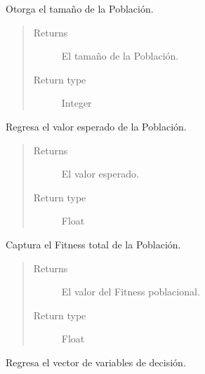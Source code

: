 \documentclass[class=report, crop=false]{standalone}
\begin{document}
\begin{fulllineitems}
\begin{fulllineitems}
Otorga el tamaño de la Población.

\begin{quote}\begin{description}
\item[{Returns}] \leavevmode
El tamaño de la Población.
\item[{Return type}] \leavevmode
Integer
\end{description}\end{quote}

\end{fulllineitems}

\begin{fulllineitems}

Regresa el valor esperado de la Población.

\begin{quote}\begin{description}
\item[{Returns}] \leavevmode
El valor esperado.
\item[{Return type}] \leavevmode
Float
\end{description}\end{quote}

\end{fulllineitems}

\begin{fulllineitems}

Captura el Fitness total de la Población.

\begin{quote}\begin{description}
\item[{Returns}] \leavevmode
El valor del Fitness poblacional.
\item[{Return type}] \leavevmode
Float
\end{description}\end{quote}

\end{fulllineitems}

\begin{fulllineitems}

Regresa el vector de variables de decisión.


\end{fulllineitems}
\end{fulllineitems}
\end{document}
